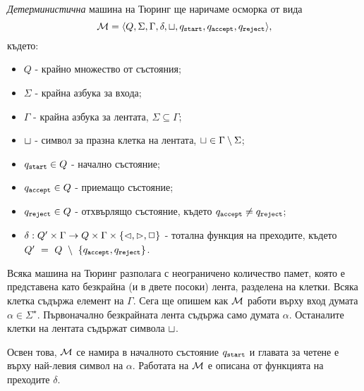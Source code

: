 {\em Детерминистична} машина на Тюринг ще наричаме осморка от вида 
\[\mathcal{M} = \langle{Q,\Sigma,\Gamma,\delta,\sqcup,q_{\texttt{start}},q_{\texttt{accept}}, q_{\texttt{reject}}}\rangle,\] където:
\begin{itemize}
\item 
  $Q$ - крайно множество от състояния;
\item
  $\Sigma$ - крайна азбука за входа;
\item
  $\Gamma$ - крайна азбука за лентата, $\Sigma \subseteq \Gamma$;

\item
  $\sqcup$ - символ за празна клетка на лентата,  $\sqcup \in \Gamma \setminus \Sigma$;
\item
  $q_{\texttt{start}} \in Q$ - начално състояние;
\item
  $q_{\texttt{accept}} \in Q$ - приемащо състояние;
\item
  $q_{\texttt{reject}} \in Q$ - отхвърлящо състояние, където $q_{\texttt{accept}} \neq q_{\texttt{reject}}$;
\item
  $\delta:Q'\times\Gamma \to Q\times \Gamma \times \{\lhd,\rhd,\Box\}$ - тотална функция на преходите, където\\
  $Q'~=~Q~\setminus~\{q_{\texttt{accept}}, q_{\texttt{reject}}\}$.
\end{itemize}

Всяка машина на Тюринг разполага с неограничено количество памет, която е представена като безкрайна (и в двете посоки) лента, разделена на клетки.
Всяка клетка съдържа елемент на $\Gamma$.
Сега ще опишем как $\mathcal{M}$ работи върху вход думата $\alpha \in \Sigma^\star$.
Първоначално безкрайната лента съдържа само думата $\alpha$. Останалите клетки на лентата съдържат символа $\sqcup$.

Освен това, $\mathcal{M}$ се намира в началното състояние $q_{\texttt{start}}$ и главата за четене е върху най-левия символ на $\alpha$.
Работата на $\mathcal{M}$ е описана от функцията на преходите $\delta$.
  
